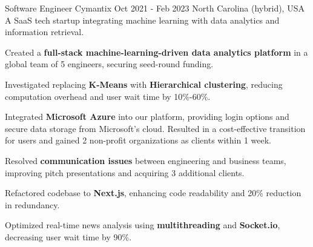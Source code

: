 \begin{cventries}
    \cventry
    {Software Engineer} %
    {Cymantix} %
    {Oct 2021 - Feb 2023} %
    {North Carolina (hybrid), USA} %
    {A SaaS tech startup integrating machine learning with data analytics and information retrieval.}
    {
      \begin{cvitems} %
        \item {Created a \textbf{full-stack machine-learning-driven data analytics platform} in a global team of 5 engineers, securing seed-round funding.}
        \item {Investigated replacing \textbf{K-Means} with \textbf{Hierarchical clustering}, reducing computation overhead and user wait time by 10\%-60\%.}
        \item {Integrated \textbf{Microsoft Azure} into our platform, providing login options and secure data storage from Microsoft's cloud. Resulted in a cost-effective transition for users and gained 2 non-profit organizations as clients within 1 week.}
        \item {Resolved \textbf{communication issues} between engineering and business teams, improving pitch presentations and acquiring 3 additional clients.}
        \item {Refactored codebase to \textbf{Next.js}, enhancing code readability and 20\% reduction in redundancy.}
        \item {Optimized real-time news analysis using \textbf{multithreading} and \textbf{Socket.io}, decreasing user wait time by 90\%.}
      \end{cvitems}
    }


\end{cventries}
